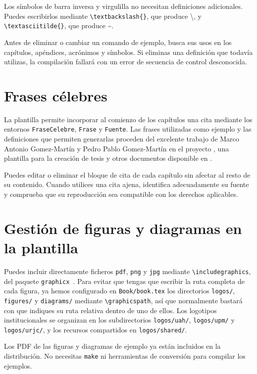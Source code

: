 Los símbolos de barra inversa y virgulilla no necesitan definiciones adicionales. Puedes escribirlos mediante \texttt{\textbackslash{}textbackslash\{\}}, que produce \textbackslash{}, y \texttt{\textbackslash{}textasciitilde\{\}}, que produce \textasciitilde{}.

Antes de eliminar o cambiar un comando de ejemplo, busca sus usos en los capítulos, apéndices, acrónimos y símbolos. Si eliminas una definición que todavía utilizas, la compilación fallará con un error de secuencia de control desconocida.

\section{Frases célebres}
\label{sec:uso-de-frases}

La plantilla permite incorporar al comienzo de los capítulos una cita mediante los entornos \texttt{FraseCelebre}, \texttt{Frase} y \texttt{Fuente}. Las frases utilizadas como ejemplo y las definiciones que permiten generarlas proceden del excelente trabajo de Marco Antonio Gomez-Martín y Pedro Pablo Gomez-Martín en el proyecto \texis{}, una plantilla para la creación de tesis y otros documentos disponible en \cite{texis}.

Puedes editar o eliminar el bloque de cita de cada capítulo sin afectar al resto de su contenido. Cuando utilices una cita ajena, identifica adecuadamente su fuente y comprueba que su reproducción sea compatible con los derechos aplicables.

\section{Gestión de figuras y diagramas en la plantilla}
\label{sec:diagrama}

Puedes incluir directamente ficheros \texttt{pdf}, \texttt{png} y \texttt{jpg} mediante \texttt{\textbackslash{}includegraphics}, del paquete \texttt{graphicx}~\cite{graphicx-manual}. Para evitar que tengas que escribir la ruta completa de cada figura, ya hemos configurado en \texttt{Book/book.tex} los directorios \texttt{logos/}, \texttt{figures/} y \texttt{diagrams/} mediante \texttt{\textbackslash{}graphicspath}, así que normalmente bastará con que indiques su ruta relativa dentro de uno de ellos. Los logotipos institucionales se organizan en los subdirectorios \texttt{logos/uah/}, \texttt{logos/upm/} y \texttt{logos/urjc/}, y los recursos compartidos en \texttt{logos/shared/}.

Los PDF de las figuras y diagramas de ejemplo ya están incluidos en la distribución. No necesitas \texttt{make} ni herramientas de conversión para compilar los ejemplos.

